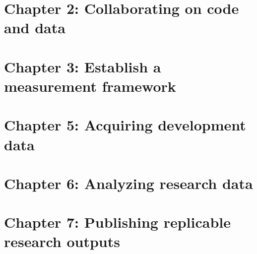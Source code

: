 \chapter{Chapter 2: Collaborating on code and data}
\label{ch:2}





\chapter{Chapter 3: Establish a measurement framework}
\label{ch:4}




\chapter{Chapter 5: Acquiring development data}
\label{ch:5}




\chapter{Chapter 6: Analyzing research data}
\label{ch:6}




\chapter{Chapter 7: Publishing replicable research outputs}
\label{ch:7}



